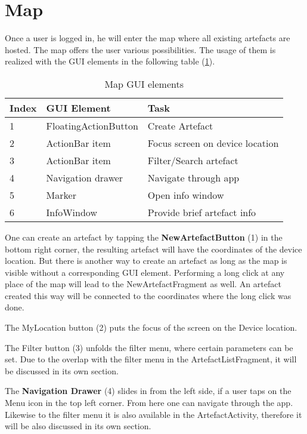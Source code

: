 \section{Map}
Once a user is logged in, he will enter the map where all existing artefacts are hosted. The map offers the user various possibilities. The usage of them is realized with the GUI elements in the following table (\ref{table:map_gui_elements}).  

\begin{table}[h]
\centering
\begin{tabular}{|l|l|l|}
\hline
\textbf{Index} & \textbf{GUI Element} & \textbf{Task}                   \\ \hline
1              & FloatingActionButton & Create Artefact                 \\ \hline
2              & ActionBar item       & Focus screen on device location \\ \hline
3              & ActionBar item       & Filter/Search artefact          \\ \hline
4              & Navigation drawer    & Navigate through app            \\ \hline
5              & Marker               & Open info window                \\ \hline
6              & InfoWindow           & Provide brief artefact info     \\ \hline
\end{tabular}
\caption{Map GUI elements}
\label{table:map_gui_elements}
\end{table}



One can create an artefact by tapping the \textbf{NewArtefactButton} (1) in the bottom right corner, the resulting artefact will have the coordinates of the device location. But there is another way to create an artefact as long as the map is visible without a corresponding GUI element. Performing a long click at any place of the map will lead to the NewArtefactFragment as well. An artefact created this way will be connected to the coordinates where the long click was done.

The MyLocation button (2) puts the focus of the screen on the Device location.

The Filter button (3) unfolds the filter menu, where certain parameters can be set. Due to the overlap with the filter menu in the ArtefactListFragment, it will be discussed in its own section.

The \textbf{Navigation Drawer} (4) slides in from the left side, if a user taps on the Menu icon in the top left corner. From here one can navigate through the app. Likewise to the filter menu it is also available in the ArtefactActivity, therefore it will be also discussed in its own section.

